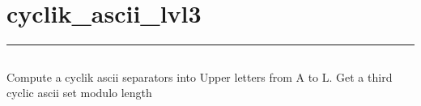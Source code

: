 \documentclass[letterpaper,10pt,english]{sphinxmanual}
\begin{document}
\subsection{}
\label{\detokenize{cyclik_ascii_lvl2v3:source-code}}
\begin{sphinxVerbatim}[commandchars=\\\{\}]
\PYG{p}{[}\PYG{p}{]}
 \PYG{p}{[}\PYG{p}{]}
 
\end{sphinxVerbatim}

\newpage
\section{cyclik\_ascii\_lvl3}
\label{\detokenize{cyclik_ascii_lvl3v3:cyclik-ascii-lvl3}}\label{\detokenize{cyclik_ascii_lvl3v3::doc}}
\begin{sphinxVerbatim}[commandchars=\\\{\}]
 
\end{sphinxVerbatim}


\bigskip\hrule\bigskip



\subsection{}
\label{\detokenize{cyclik_ascii_lvl3v3:algorithm}}
\sphinxAtStartPar
Compute a cyclik ascii separators into Upper letters from A to L.
Get a third cyclic ascii set modulo length
\end{document}

